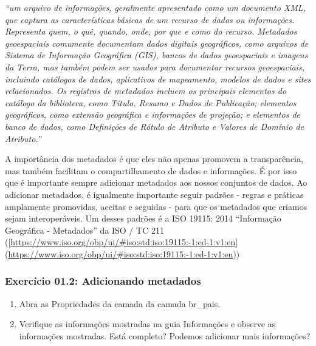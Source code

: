\documentclass[
]{book}
\providecommand{\tightlist}{%
  \setlength{\itemsep}{0pt}\setlength{\parskip}{0pt}}
\begin{document}
\emph{``um arquivo de informações, geralmente apresentado como um documento XML, que captura as características básicas de um recurso de dados ou informações. Representa quem, o quê, quando, onde, por que e como do recurso. Metadados geoespaciais comumente documentam dados digitais geográficos, como arquivos de Sistema de Informação Geográfica (GIS), bancos de dados geoespaciais e imagens da Terra, mas também podem ser usados para documentar recursos geoespaciais, incluindo catálogos de dados, aplicativos de mapeamento, modelos de dados e sites relacionados. Os registros de metadados incluem os principais elementos do catálogo da biblioteca, como Título, Resumo e Dados de Publicação; elementos geográficos, como extensão geográfica e informações de projeção; e elementos de banco de dados, como Definições de Rótulo de Atributo e Valores de Domínio de Atributo.''}

A importância dos metadados é que eles não apenas promovem a transparência, mas também facilitam o compartilhamento de dados e informações. É por isso que é importante sempre adicionar metadados aos nossos conjuntos de dados. Ao adicionar metadados, é igualmente importante seguir padrões - regras e práticas amplamente promovidas, aceitas e seguidas - para que os metadados que criamos sejam interoperáveis. Um desses padrões é a ISO 19115: 2014 ``Informação Geográfica - Metadados'' da ISO / TC 211 ({[}\url{https://www.iso.org/obp/ui/\#iso:std:iso:19115:-1:ed-1:v1:en}{]} (\url{https://www.iso.org/obp/ui/\#iso:std:iso:19115:-1:ed-1:v1:en}))

\hypertarget{exercuxedcio-01.2-adicionando-metadados}{%
\subsubsection{\texorpdfstring{\textbf{Exercício 01.2: Adicionando metadados}}{Exercício 01.2: Adicionando metadados}}\label{exercuxedcio-01.2-adicionando-metadados}}

\begin{enumerate}
\def\labelenumi{\arabic{enumi}.}
\tightlist
\item
  Abra as Propriedades da camada da camada br\_pais.
\item
  Verifique as informações mostradas na guia Informações e observe as informações mostradas. Está completo? Podemos adicionar mais informações?
\end{enumerate}
\end{document}
